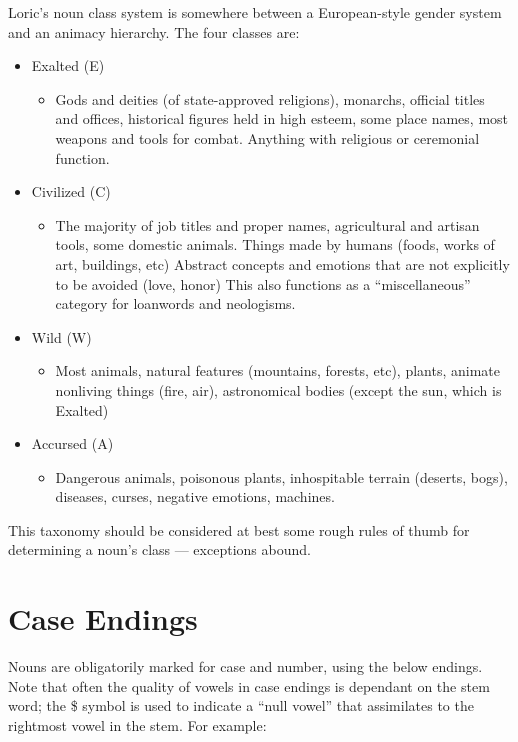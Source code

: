 \documentclass[oneside]{book}
\begin{document}
Loric's noun class system is somewhere between a European-style gender system and an animacy hierarchy. The four classes are:

\begin{itemize}
    \item Exalted (E)
    \begin{itemize}
        \item Gods and deities (of state-approved religions), monarchs, official titles and offices, historical figures held in high esteem, some place names, most weapons and tools for combat. Anything with religious or ceremonial function.
    \end{itemize}
    \item Civilized (C)
    \begin{itemize}
        \item The majority of job titles and proper names, agricultural and artisan tools,  some domestic animals. Things made by humans (foods, works of art, buildings, etc)  Abstract concepts and emotions that are not explicitly to be avoided (love, honor)  This also functions as a ``miscellaneous'' category for loanwords and neologisms.
    \end{itemize}
    \item Wild (W)
    \begin{itemize}
        \item Most animals, natural features (mountains, forests, etc), plants, animate nonliving things (fire, air),  astronomical bodies (except the sun, which is Exalted)
    \end{itemize}
    \item Accursed (A)
    \begin{itemize}
        \item Dangerous animals, poisonous plants, inhospitable terrain (deserts, bogs), diseases, curses, negative emotions, machines.
    \end{itemize}
\end{itemize}


This taxonomy should be considered at best some rough rules of thumb for determining a noun's class --- exceptions abound. \\

\newpage
\section{Case Endings}
\label{section:cases}
Nouns are obligatorily marked for case and number, using the below endings. Note that often the quality of vowels in case endings is dependant on the stem word; the \$ symbol is used to indicate a ``null vowel'' that assimilates to the rightmost vowel in the stem. For example:
\end{document}
